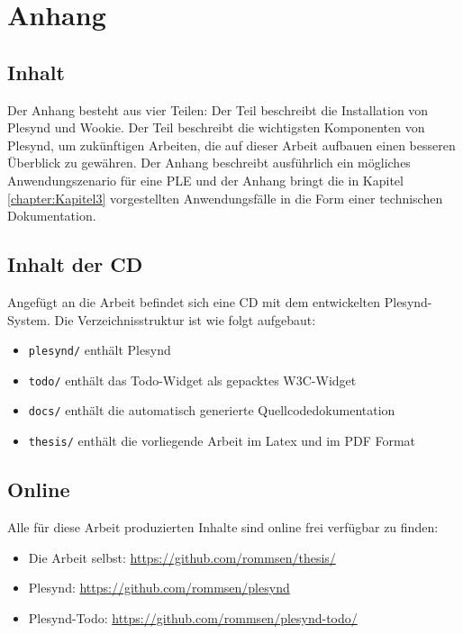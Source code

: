 \chapter{Anhang} \label{AppendixA}

\section{Inhalt} 
Der Anhang besteht aus vier Teilen: Der Teil  beschreibt die Installation von Plesynd und Wookie. Der Teil  beschreibt die wichtigsten Komponenten von Plesynd, um zukünftigen Arbeiten, die auf dieser Arbeit aufbauen einen besseren Überblick zu gewähren. Der Anhang  beschreibt ausführlich ein mögliches Anwendungszenario für eine PLE und der Anhang  bringt die in Kapitel \ref{chapter:Kapitel3} vorgestellten Anwendungsfälle in die Form einer technischen Dokumentation.

\section{Inhalt der CD}
Angefügt an die Arbeit befindet sich eine CD mit dem entwickelten Plesynd-System. Die Verzeichnisstruktur ist wie folgt aufgebaut:
\begin{itemize}
 \item \texttt{plesynd/} enthält Plesynd
 \item \texttt{todo/} enthält das Todo-Widget als gepacktes W3C-Widget
 \item \texttt{docs/} enthält die automatisch generierte Quellcodedokumentation
 \item \texttt{thesis/} enthält die vorliegende Arbeit im Latex und im PDF Format
\end{itemize}

\section{Online}
Alle für diese Arbeit produzierten Inhalte sind online frei verfügbar zu finden:
\begin{itemize}
 \item Die Arbeit selbst: \url{https://github.com/rommsen/thesis/}
 \item Plesynd: \url{https://github.com/rommsen/plesynd}
 \item Plesynd-Todo: \url{https://github.com/rommsen/plesynd-todo/}
\end{itemize}


